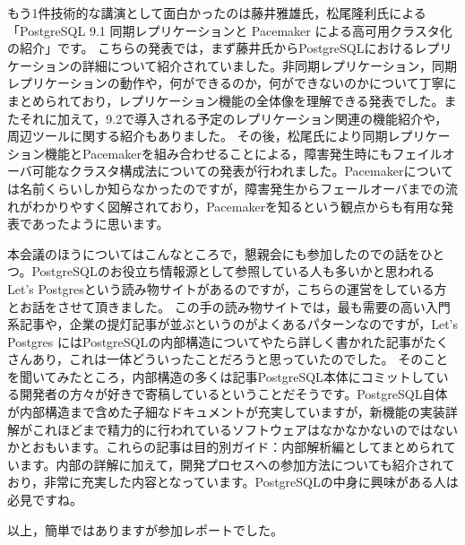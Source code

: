 もう1件技術的な講演として面白かったのは藤井雅雄氏，松尾隆利氏による「PostgreSQL 9.1 同期レプリケーションと Pacemaker による高可用クラスタ化の紹介」です。 こちらの発表では，まず藤井氏からPostgreSQLにおけるレプリケーションの詳細について紹介されていました。非同期レプリケーション，同期レプリケーションの動作や，何ができるのか，何ができないのかについて丁寧にまとめられており，レプリケーション機能の全体像を理解できる発表でした。またそれに加えて，9.2で導入される予定のレプリケーション関連の機能紹介や，周辺ツールに関する紹介もありました。 その後，松尾氏により同期レプリケーション機能とPacemakerを組み合わせることによる，障害発生時にもフェイルオーバ可能なクラスタ構成法についての発表が行われました。Pacemakerについては名前くらいしか知らなかったのですが，障害発生からフェールオーバまでの流れがわかりやすく図解されており，Pacemakerを知るという観点からも有用な発表であったように思います。

本会議のほうについてはこんなところで，懇親会にも参加したのでの話をひとつ。PostgreSQLのお役立ち情報源として参照している人も多いかと思われるLet's
Postgresという読み物サイトがあるのですが，こちらの運営をしている方とお話をさせて頂きました。 この手の読み物サイトでは，最も需要の高い入門系記事や，企業の提灯記事が並ぶというのがよくあるパターンなのですが，Let's Postgres
にはPostgreSQLの内部構造についてやたら詳しく書かれた記事がたくさんあり，これは一体どういったことだろうと思っていたのでした。 そのことを聞いてみたところ，内部構造の多くは記事PostgreSQL本体にコミットしている開発者の方々が好きで寄稿しているということだそうです。PostgreSQL自体が内部構造まで含めた子細なドキュメントが充実していますが，新機能の実装詳解がこれほどまで精力的に行われているソフトウェアはなかなかないのではないかとおもいます。これらの記事は目的別ガイド：内部解析編としてまとめられています。内部の詳解に加えて，開発プロセスへの参加方法についても紹介されており，非常に充実した内容となっています。PostgreSQLの中身に興味がある人は必見ですね。

以上，簡単ではありますが参加レポートでした。


